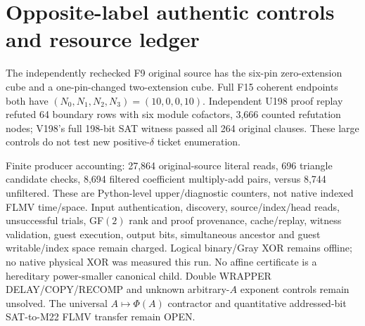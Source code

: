 \documentclass[11pt]{article}
\begin{document}
\section*{Opposite-label authentic controls and resource ledger}
The independently rechecked F9 original source has the six-pin zero-extension cube and a one-pin-changed two-extension cube. Full F15 coherent endpoints both have $(N_0,N_1,N_2,N_3)=(10,0,0,10)$. Independent U198 proof replay refuted 64 boundary rows with six module cofactors, 3,666 counted refutation nodes; V198's full 198-bit SAT witness passed all 264 original clauses. These large controls do not test new positive-$\delta$ ticket enumeration.
\par\noindent Finite producer accounting: 27,864 original-source literal reads, 696 triangle candidate checks, 8,694 filtered coefficient multiply-add pairs, versus 8,744 unfiltered. These are Python-level upper/diagnostic counters, not native indexed FLMV time/space. Input authentication, discovery, source/index/head reads, unsuccessful trials, GF$(2)$ rank and proof provenance, cache/replay, witness validation, guest execution, output bits, simultaneous ancestor and guest writable/index space remain charged. Logical binary/Gray XOR remains offline; no native physical XOR was measured this run. No affine certificate is a hereditary power-smaller canonical child. Double WRAPPER DELAY/COPY/RECOMP and unknown arbitrary-$A$ exponent controls remain unsolved. The universal $A\mapsto\Phi(A)$ contractor and quantitative addressed-bit SAT-to-M22 FLMV transfer remain OPEN.
\end{document}
